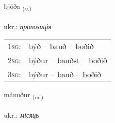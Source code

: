 \documentclass[frontgrid, backgrid]{flacards}\usepackage[]{graphicx}\usepackage[]{xcolor}
\begin{document}
\renewcommand{\blhead}{\vskip5pt {\small\bfseries\footnotesize Sagnorð | дієслово }}
\renewcommand{\bcfoot}{\vskip5pt \hspace{2pt}{\small\bfseries\footnotesize 1K}}


{bjóða \small{\textsubscript{(\textit{v.})}} \\[1ex] %
\textphonetic{[pjouːða]} \\
ukr.: \emph{пропозиція} \\  [2ex]
\renewcommand*{\arraystretch}{0.8}
\begin{tabular}{p{1cm}l}
\textsc{1sg}: & býð -- bauð -- boðið \\ 
\textsc{2sg}: & býður -- bauðst -- boðið \\ 
\textsc{3sg}: & býður -- bauð -- boðið \\ 
\end{tabular}
}

\renewcommand{\flhead}{\vskip5pt \fboxsep=0pt {\small\bfseries\footnotesize Nafnorð | іменник}}
\renewcommand{\fcfoot}{\vskip5pt \fboxsep=0pt \hspace{2pt}{\small\bfseries\footnotesize 1K}}

\renewcommand{\blhead}{\vskip5pt {\small\bfseries\footnotesize Nafnorð | іменник }}
\renewcommand{\bcfoot}{\vskip5pt \hspace{2pt}{\small\bfseries\footnotesize 1K}}


{mánuður \small{\textsubscript{(\textit{m.})}} \\[1ex] %
\textphonetic{[mauːnʏðʏr]} \\
ukr.: \emph{місяць} \\  [2ex]
\renewcommand*{\arraystretch}{0.8}
}

\renewcommand{\flhead}{\vskip5pt \fboxsep=0pt {\small\bfseries\footnotesize Lýsingarorð | прикметник}}
\renewcommand{\fcfoot}{\vskip5pt \fboxsep=0pt \hspace{2pt}{\small\bfseries\footnotesize 1K}}
\end{document}
